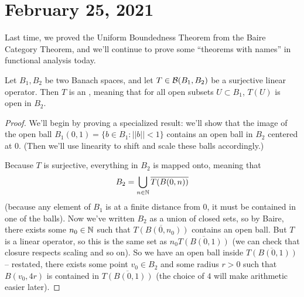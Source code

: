 \pagebreak\section*{February 25, 2021}

Last time, we proved the Uniform Boundedness Theorem from the Baire Category Theorem, and we'll continue to prove some ``theorems with names'' in functional analysis today.

\begin{theorem}
Let $B_1, B_2$ be two Banach spaces, and let $T \in \mathcal{B}(B_1, B_2)$ be a surjective linear operator. Then $T$ is an , meaning that for all open subsets $U \subset B_1$, $T(U)$ is open in $B_2$.
\end{theorem}
\begin{proof}
We'll begin by proving a specialized result: we'll show that the image of the open ball $B_1(0, 1) = \{b \in B_1: ||b|| < 1\}$ contains an open ball in $B_2$ centered at $0$. (Then we'll use linearity to shift and scale these balls accordingly.)

Because $T$ is surjective, everything in $B_2$ is mapped onto, meaning that 
\[
    B_2 = \bigcup_{n \in \mathbb N} \overline{T(B(0, n))}
\]  
(because any element of $B_1$ is at a finite distance from $0$, it must be contained in one of the balls). Now we've written $B_2$ as a union of closed sets, so by Baire, there exists some $n_0 \in \mathbb N$ such that $\overline{T(B(0, n_0))}$ contains an open ball. But $T$ is a linear operator, so this is the same set as $n_0 \overline{T(B(0, 1))}$ (we can check that closure respects scaling and so on). So we have an open ball inside $\overline{T(B(0, 1))}$ -- restated, there exists some point $v_0 \in B_2$ and some radius $r > 0$ such that $B(v_0, 4r)$ is contained in $\overline{T(B(0, 1))}$ (the choice of $4$ will make arithmetic easier later). 


\end{proof}
